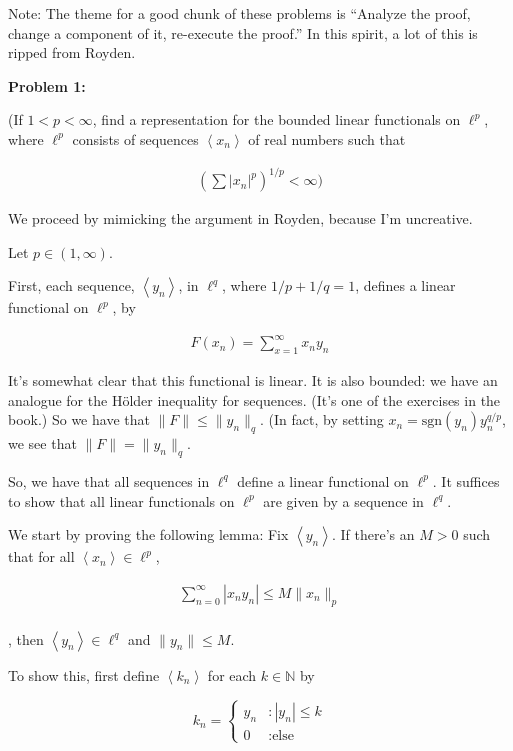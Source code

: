 \documentclass[a4paper,12pt]{article}
\newcommand{\tab}{\hspace{4mm}} %
\newcommand{\absval}[1]{\left\lvert #1 \right\rvert}
\newcommand{\norm}[1]{\|#1\|}
\newcommand{\anbrack}[1]{\left\langle #1 \right\rangle}
\newcommand{\N}{\mathbb{N}}
\begin{document}
Note: The theme for a good chunk of these problems is ``Analyze the proof, change a component of it, re-execute the proof.'' In this spirit, a lot of this is ripped from Royden.

{\bf Problem 1:} %

(If $1 < p < \infty$, find a representation for the bounded linear functionals on $\ell^p$, where $\ell^p$ consists of sequences $\anbrack{x_n}$ of real numbers such that

\begin{align*}
(\sum\absval{x_n}^p)^{1/p}<\infty ) 
\end{align*}

We proceed by mimicking the argument in Royden, because I'm uncreative.

Let $p \in (1,\infty)$.

First, each sequence, $\anbrack{y_n}$, in $\ell^q$, where $1/p + 1/q = 1$, defines a linear functional on $\ell^p$, by

\begin{align*}
F(x_n)= \sum\limits_{x=1}^\infty x_ny_n
\end{align*}

It's somewhat clear that this functional is linear. It is also bounded: we have an analogue for the H{\"o}lder inequality for sequences. (It's one of the exercises in the book.) So we have that $\norm{F} \leq \norm{y_n}_q$. (In fact, by setting $x_n = \text{sgn}(y_n) y_n^{q/p}$, we see that $\norm{F} = \norm{y_n}_q$.

So, we have that all sequences in $\ell^q$ define a linear functional on $\ell^p$. It suffices to show that all linear functionals on $\ell^p$ are given by a sequence in $\ell^q$.

We start by proving the following lemma: Fix $\anbrack{y_n}$. If there's an $M >0$ such that for all $\anbrack{x_n} \in \ell^p$,

\begin{align*}
\sum\limits_{n=0}^\infty \absval{x_ny_n} \leq M\norm{x_n}_p\\
\end{align*}

, then $\anbrack{y_n} \in \ell^q$ and $\norm{y_n} \leq M$.

\tab To show this, first define $\anbrack{k_n}$ for each $k \in \N$ by

 \begin{displaymath}
   k_n = \left\{
     \begin{array}{lr}
       y_n & : \absval{y_n} \leq k\\
       0 & : \text{else}    \end{array}
   \right.
\end{displaymath} 
\end{document}
